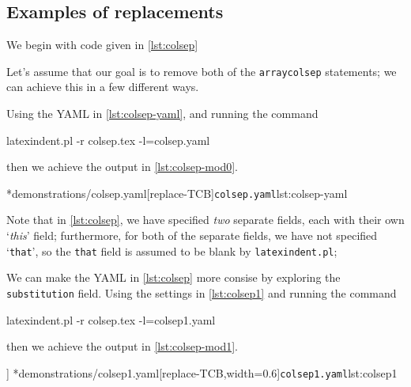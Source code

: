 \subsection{Examples of replacements}
	\begin{example}
		We begin with code given in \cref{lst:colsep}


		Let's assume that our goal is to remove both of the \texttt{arraycolsep} statements; we can achieve this in
		a few different ways.

		Using the YAML in \cref{lst:colsep-yaml}, and running the command
		\begin{commandshell}
latexindent.pl -r colsep.tex -l=colsep.yaml
\end{commandshell}
		then we achieve the output in \cref{lst:colsep-mod0}.
		\begin{cmhtcbraster}[raster column skip=.01\linewidth]
			\cmhlistingsfromfile*[style=yaml-LST]*{demonstrations/colsep.yaml}[replace-TCB]{\texttt{colsep.yaml}}{lst:colsep-yaml}
		\end{cmhtcbraster}
		Note that in \cref{lst:colsep}, we have specified \emph{two} separate fields, each with their own `\emph{this}' field;
		furthermore, for both of the separate fields, we have not specified `\texttt{that}', so the \texttt{that} field
		is assumed to be blank by \texttt{latexindent.pl};

		We can make the YAML in \cref{lst:colsep} more consise by exploring the \texttt{substitution} field. Using
		the settings in \cref{lst:colsep1} and running the command
		\begin{commandshell}
latexindent.pl -r colsep.tex -l=colsep1.yaml
\end{commandshell}
		then we achieve the output in \cref{lst:colsep-mod1}.
		\begin{cmhtcbraster}[raster column skip=.01\linewidth,
				raster force size=false,
				raster column 1/.style={add to width=-.1\textwidth}]
			]
			\cmhlistingsfromfile*[style=yaml-LST]*{demonstrations/colsep1.yaml}[replace-TCB,width=0.6\textwidth]{\texttt{colsep1.yaml}}{lst:colsep1}
		\end{cmhtcbraster}


\end{example}
